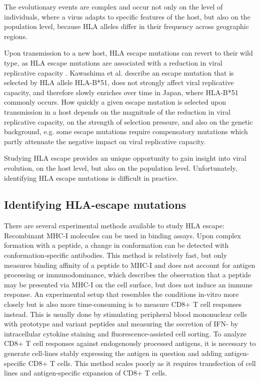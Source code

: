 \documentclass[fleqn,11pt]{SelfArx} %
\begin{document}
The evolutionary events are complex and occur not only on the level of individuals, 
where a virus adapts to specific features of the host, but also on the population level,
because HLA alleles differ in their frequency across geographic regions\nolinebreak\cite{Kawashima2009}.

Upon transmission to a new host, HLA escape mutations can revert to their wild type,
as HLA escape mutations are associated with a reduction in viral replicative capacity
\nolinebreak\cite{Matthews2008}. Kawashima et al.\nolinebreak\cite{Kawashima2009}
describe an escape mutation that is selected by HLA allele HLA-B*51,
does not strongly affect viral replicative capacity, and therefore slowly enriches
over time in Japan, where HLA-B*51 commonly occurs.
How quickly a given escape mutation is selected upon transmission in a host depends on the
magnitude of the reduction in viral replicative capacity, on the strength of selection
pressure, and also on the genetic background, e.g. some escape mutations require compensatory 
mutations which partly attenuate the negative impact on viral replicative capacity.

Studying HLA escape provides an unique opportunity to gain insight into
viral evolution, on the host level, but also on the population level.
Unfortunately, identifying HLA escape mutations is difficult in practice.

\subsection{Identifying HLA-escape mutations}

There are several experimental methods available to study HLA escape:
Recombinant MHC-I molecules can be used in binding assays. Upon complex formation
with a peptide, a change in conformation can be detected with conformation-specific
antibodies. This method is relatively fast, but only measures binding affinity of a
peptide to MHC-I and does not account for antigen processing or immunodominance, 
which describes the observation that a peptide may be presented via MHC-I on the cell 
surface, but does not induce an immune response.
An experimental setup that resembles the conditions in-vitro more closely but is also
more time-consuming is to measure
CD8+ T cell responses instead. This is usually done by stimulating peripheral blood
mononuclear cells with prototype and variant peptides and measuring the secretion of
IFN-\gamma{} by intracellular cytokine
staining and fluorescence-assisted cell sorting.
To analyze CD8+ T cell responses against endogenously processed antigens, it is necessary
to generate cell-lines stably expressing the antigen in question and adding antigen-specific
CD8+ T cells. This method scales poorly as it requires transfection of cell lines and
antigen-specific expansion of CD8+ T cells.
\end{document}
